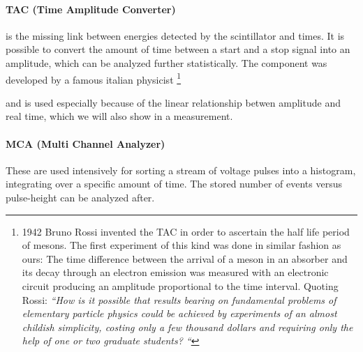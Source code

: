 \paragraph{TAC (Time Amplitude Converter)} is the missing link between energies detected by the scintillator
and times. It is possible to convert the amount of time between a start and a stop signal into an amplitude,
which can be analyzed further statistically. The component was developed by a famous italian physicist
\footnote{1942 Bruno Rossi invented the TAC in order to ascertain the half life period of mesons. The first
    experiment of this kind was done in similar fashion as ours: The time difference between the
    arrival of a meson in an absorber and its decay through an electron emission was measured with an
    electronic circuit producing an amplitude proportional to the time interval. Quoting Rossi:
    \textit{``How is it possible that results bearing on fundamental problems of
        elementary particle physics could be achieved by experiments of an almost childish simplicity,
        costing only a few thousand dollars and requiring only the help of one or two graduate students? ``}}

and is used especially because of the linear relationship betwen amplitude and real time, which we will also
show in a measurement.
\paragraph{MCA (Multi Channel Analyzer)} These are used intensively for sorting a stream of voltage pulses
into a histogram, integrating over a specific amount of time. The stored number of events versus pulse-height
can be analyzed after.
